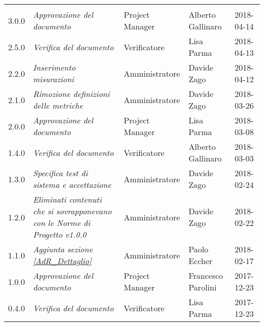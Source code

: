 \newpage 
\section*{}
\begin{table}[H]
	\centering
	\begin{tabular}{C{2cm}|C{4cm}|C{3cm}|C{3cm}|R{2cm}}
		
		 & & & & \\
		
			3.0.0 & \emph{Approvazione del documento} & Project Manager & Alberto Gallinaro & 2018-04-14 \\
		\hline
		
		2.5.0 & \emph{Verifica del documento} & Verificatore &  Lisa Parma & 2018-04-13\\
		\hline
		
		2.2.0 & \emph{Inserimento misurazioni} & Amministratore & Davide Zago & 2018-04-12 \\
		\hline
		
		2.1.0 & \emph{Rimozione definizioni delle metriche} & Amministratore & Davide Zago & 2018-03-26 \\
		\hline

		2.0.0 & \emph{Approvazione del documento} & Project Manager & Lisa Parma & 2018-03-08 \\
		\hline
		
		1.4.0 & \emph{Verifica del documento} & Verificatore &  Alberto Gallinaro & 2018-03-03\\
		\hline
		
		1.3.0 & \emph{Specifica test di sistema e accettazione} & Amministratore &  Davide Zago & 2018-02-24 \\
		\hline
		
		1.2.0 & \emph{Eliminati contenuti che si sovrapponevano con le Norme di Progetto v1.0.0} & Amministratore &  Davide Zago & 2018-02-22 \\
		\hline
		
		1.1.0 & \emph{Aggiunta sezione \ref{AdR_Dettaglio}} & Amministratore &  Paolo Eccher & 2018-02-17 \\
		\hline
		
		1.0.0 & \emph{Approvazione del documento} & Project Manager &  Francesco Parolini & 2017-12-23 \\
		\hline
		
		0.4.0  & \emph{Verifica del documento} & Verificatore & Lisa Parma & 2017-12-23 \\
		\hline
		

\end{tabular}
\end{table}
